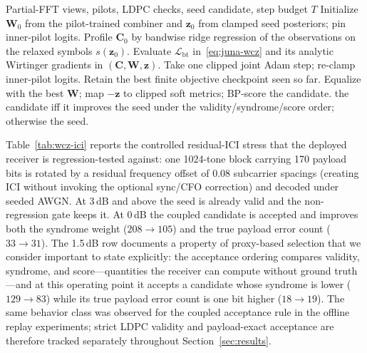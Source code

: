 \documentclass[journal]{IEEEtran}
\newcommand{\junawcz}{JUNA-WCz}
\begin{document}
\begin{algorithm}[t]
\caption{\junawcz{} constrained joint refinement}
\label{alg:junawcz}
\footnotesize
\begin{algorithmic}[1]
\Require Partial-FFT views, pilots, LDPC checks, seed candidate, step budget
  \(T\)
\State Initialize \(\mathbf W_0\) from the pilot-trained combiner and
  \(\mathbf z_0\) from clamped seed posteriors; pin inner-pilot logits.
\State Profile \(\mathbf C_0\) by bandwise ridge regression of the
  observations on the relaxed symbols \(s(\mathbf z_0)\).
  \State Evaluate \(\mathcal L_{\mathrm{bt}}\) in~\eqref{eq:juna-wcz} and its
    analytic Wirtinger gradients in \((\mathbf C,\mathbf W,\mathbf z)\).
  \State Take one clipped joint Adam step; re-clamp inner-pilot logits.
  \State Retain the best finite objective checkpoint seen so far.
\EndFor
\State Equalize with the best \(\mathbf W\); map \(-\mathbf z\) to clipped
  soft metrics; BP-score the candidate.
\State \Return the candidate iff it improves the seed under the
  validity/syndrome/score order; otherwise the seed.
\end{algorithmic}
\end{algorithm}

Table~\ref{tab:wcz-ici} reports the controlled residual-ICI stress that the
deployed receiver is regression-tested against: one 1024-tone block carrying
170 payload bits is rotated by a residual frequency offset of $0.08$
subcarrier spacings (creating ICI without invoking the optional sync/CFO
correction) and decoded under seeded AWGN. At 3\,dB and above the seed is already
valid and the non-regression gate keeps it. At 0\,dB the coupled candidate is
accepted and improves both the syndrome weight ($208\to105$) and the true
payload error count ($33\to31$). The 1.5\,dB row documents a property of
proxy-based selection that we consider important to state explicitly: the
acceptance ordering compares validity, syndrome, and score---quantities the
receiver can compute without ground truth---and at this operating point it
accepts a candidate whose syndrome is lower ($129\to83$) while its true
payload error count is one bit higher ($18\to19$). The same behavior class was
observed for the coupled acceptance rule in the offline replay experiments;
strict LDPC validity and payload-exact acceptance are therefore tracked
separately throughout Section~\ref{sec:results}.
\end{document}
